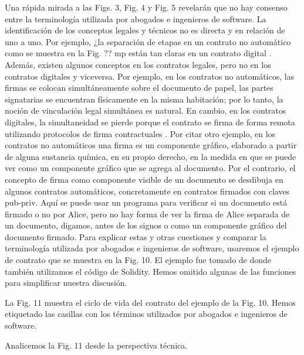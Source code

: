 \documentclass[12pt]{report} %
\begin{document}
\begin{itemize}
\begin{enumerate}
\begin{enumerate}
    Una rápida mirada a las Figs. 3, Fig. 4 y Fig. 5 revelarán que no hay consenso entre la terminología utilizada por abogados e ingenieros de software. La identificación de los conceptos legales y técnicos no es directa y en relación de uno a uno. Por ejemplo, ¿la separación de etapas en un contrato no automático como se muestra en la Fig. ??  mp están tan claras en un contrato digital . Además, existen algunos conceptos en los contratos legales, pero no en los contratos digitales y viceversa. Por ejemplo, en los contratos no automáticos, las firmas se colocan simultáneamente sobre el documento de papel, las partes signatarias se encuentran físicamente en la misma habitación; por lo tanto, la noción de vinculación legal simultánea es natural. En cambio, en los contratos digitales, la simultaneidad se pierde porque el contrato se firma de forma remota utilizando protocolos de firma contractuales . Por citar otro ejemplo, en los contratos no automáticos una firma es un componente gráfico, elaborado a partir de alguna sustancia química, en su propio derecho, en la medida en que se puede ver como un componente gráfico que se agrega al documento. Por el contrario, el concepto de firma como componente visible de un documento se desdibuja en algunos contratos automáticos, concretamente en contratos firmados con claves pub-priv. Aquí se puede usar un programa para verificar si un documento está firmado o no por Alice, pero no hay forma de ver la firma de Alice separada de un documento, digamos, antes de los signos o como un componente gráfico del documento firmado. Para explicar estas y otras cuestiones y comparar la terminología utilizada por abogados e ingenieros de software, usaremos el ejemplo de contrato que se muestra en la Fig. 10. El ejemplo fue tomado de  donde también utilizamos el código de Solidity. Hemos omitido algunas de las funciones para simplificar nuestra discusión. 
    
La Fig. 11 muestra el ciclo de vida del contrato del ejemplo de la Fig. 10. Hemos etiquetado las casillas con los términos utilizados por abogados e ingenieros de software.

Analicemos la Fig. 11 desde la perspectiva técnica.

   
    
\end{enumerate}

     
 \end{enumerate}




\end{itemize}
\end{document}
